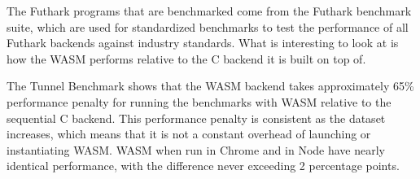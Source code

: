 \documentclass[11pt]{book}
\begin{document}
The Futhark programs that are benchmarked come from the Futhark benchmark suite, which are used for standardized benchmarks to test the performance of all Futhark backends against industry standards. What is interesting to look at is how the WASM performs relative to the C backend it is built on top of.
\begin{table}[h!]
    \noindent{}
    \caption{Caption}
    \label{tab:my_label}
\end{table}

The Tunnel Benchmark shows that the WASM backend takes approximately 65\% performance penalty for running the benchmarks with WASM relative to the sequential C backend. This performance penalty is consistent as the dataset increases, which means that it is not a constant overhead of launching or instantiating WASM. WASM when run in Chrome and in Node have nearly identical performance, with the difference never exceeding 2 percentage points.

\begin{table}[h!]
    \noindent{}
    \caption{Caption}
    \label{tab:my_label}
\end{table}
\end{document}
